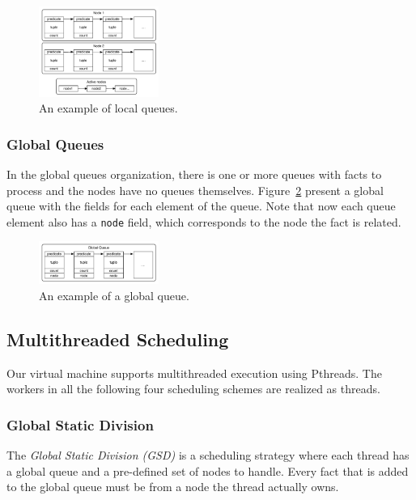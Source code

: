\documentclass[preprint]{sigplanconf}
\begin{document}
\begin{figure}[ht]
  \centering
    \includegraphics[width=0.35\textwidth]{figures/localqueues.pdf}
  \caption{An example of local queues.}
  \label{fig:localqueues}
\end{figure}

\subsubsection{Global Queues}

In the global queues organization, there is one or more queues with facts to process
and the nodes have no queues themselves. Figure~\ref{fig:globalqueue} present a
global queue with the fields for each element of the queue. Note that now each queue element
also has a \texttt{node} field, which corresponds to the node the fact is related.

\begin{figure}[ht]
  \centering
    \includegraphics[width=0.35\textwidth]{figures/globalqueue.pdf}
  \caption{An example of a global queue.}
  \label{fig:globalqueue}
\end{figure}

\subsection{Multithreaded Scheduling}

Our virtual machine supports multithreaded execution using Pthreads. The workers in all the
following four scheduling schemes are realized as threads.

\subsubsection{Global Static Division}

The \emph{Global Static Division (GSD)} is a scheduling strategy where each thread
has a global queue and a pre-defined set of nodes to handle. Every fact that is added
to the global queue must be from a node the thread actually owns.
\end{document}
